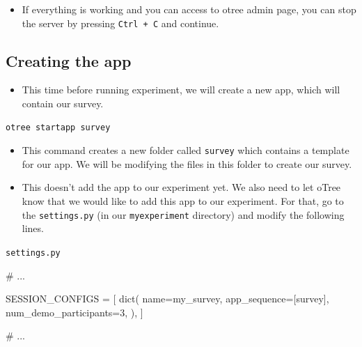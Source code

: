 \documentclass[
  letterpaper,
  DIV=11,
  numbers=noendperiod]{scrreprt}
\newenvironment{Shaded}{\begin{snugshade}}{\end{snugshade}}
\newcommand{\BuiltInTok}[1]{\textcolor[rgb]{0.00,0.23,0.31}{#1}}
\newcommand{\CommentTok}[1]{\textcolor[rgb]{0.37,0.37,0.37}{#1}}
\newcommand{\DecValTok}[1]{\textcolor[rgb]{0.68,0.00,0.00}{#1}}
\newcommand{\NormalTok}[1]{\textcolor[rgb]{0.00,0.23,0.31}{#1}}
\newcommand{\OperatorTok}[1]{\textcolor[rgb]{0.37,0.37,0.37}{#1}}
\newcommand{\StringTok}[1]{\textcolor[rgb]{0.13,0.47,0.30}{#1}}
\providecommand{\tightlist}{%
  \setlength{\itemsep}{0pt}\setlength{\parskip}{0pt}}\usepackage{longtable,booktabs,array}
\begin{document}
\begin{itemize}
\tightlist
\item
  If everything is working and you can access to otree admin page, you
  can stop the server by pressing \texttt{Ctrl\ +\ C} and continue.
\end{itemize}

\hypertarget{creating-the-app}{%
\subsection{Creating the app}\label{creating-the-app}}

\begin{itemize}
\tightlist
\item
  This time before running experiment, we will create a new app, which
  will contain our survey.
\end{itemize}

\begin{verbatim}
otree startapp survey
\end{verbatim}

\begin{itemize}
\item
  This command creates a new folder called \texttt{survey} which
  contains a template for our app. We will be modifying the files in
  this folder to create our survey.
\item
  This doesn't add the app to our experiment yet. We also need to let
  oTree know that we would like to add this app to our experiment. For
  that, go to the \texttt{settings.py} (in our \texttt{myexperiment}
  directory) and modify the following lines.
\end{itemize}

\begin{codelisting}

\caption{\texttt{settings.py}}

\begin{Shaded}
\begin{Highlighting}[]
\CommentTok{\# ...}

\NormalTok{SESSION\_CONFIGS }\OperatorTok{=}\NormalTok{ [}
     \BuiltInTok{dict}\NormalTok{(}
\NormalTok{         name}\OperatorTok{=}\StringTok{\textquotesingle{}my\_survey\textquotesingle{}}\NormalTok{,}
\NormalTok{         app\_sequence}\OperatorTok{=}\NormalTok{[}\StringTok{\textquotesingle{}survey\textquotesingle{}}\NormalTok{],}
\NormalTok{         num\_demo\_participants}\OperatorTok{=}\DecValTok{3}\NormalTok{,}
\NormalTok{     ),}
\NormalTok{]}

\CommentTok{\# ...}
\end{Highlighting}
\end{Shaded}

\end{codelisting}
\end{document}

